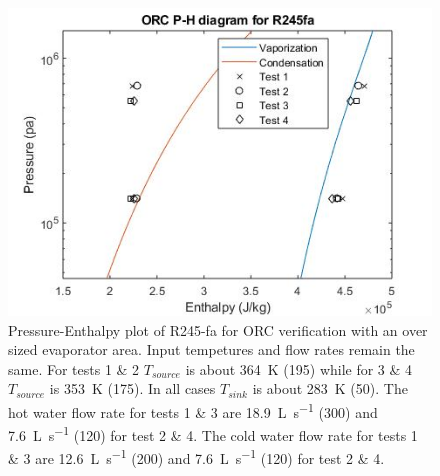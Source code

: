 \begin{figure}%
	\centering
	\caption{Pressure-Enthalpy plot of R245-fa for ORC verification with an over sized evaporator area. Input tempetures and flow rates remain the same. 
	For tests 1 \& 2 $T_{source}$ is about \SI{364}{\kelvin} (\SI{195}{\degreeFahrenheit})
	while for 3 \& 4 $T_{source}$ is \SI{353}{\kelvin} (\SI{175}{\degreeFahrenheit}). 
	In all cases $T_{sink}$ is about \SI{283}{\kelvin} (\SI{50}{\degreeFahrenheit}). 
	The hot water flow rate for tests 1 \& 3 are \SI{18.9}{\liter\per\second} (\SI{300}{\gpm})
	and	\SI{7.6}{\liter\per\second} (\SI{120}{\gpm}) for test 2 \& 4. 
	The cold water flow rate for tests 1 \& 3 are \SI{12.6}{\liter\per\second} (\SI{200}{\gpm})
	and \SI{7.6}{\liter\per\second} (\SI{120}{\gpm}) for test 2 \& 4.}
	\label{fig:verifcation_ph02}
	
	\includegraphics[width=\textwidth]{figures/VerificationPH02}
\end{figure}